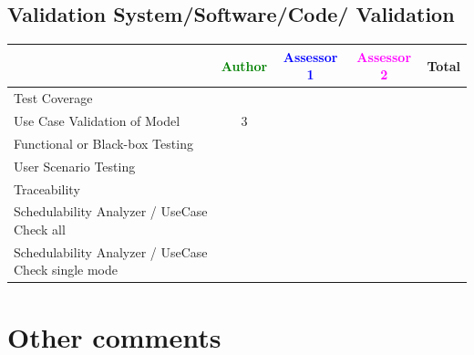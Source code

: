 	
\subsection{Validation System/Software/Code/ Validation	}


\begin{tabular}{|l | c | c | c | c|}
\hline
& \textcolor{green}{Author} & \textcolor{blue}{Assessor 1} & \textcolor{magenta}{Assessor 2} & Total \\
\hline 
Test Coverage & & & &  \\
\hline
Use Case Validation of Model & 3& & &  \\
\hline
Functional or Black-box Testing & & & &  \\
\hline
User Scenario Testing & & & &  \\
\hline
Traceability & & & &  \\
\hline
Schedulability Analyzer / UseCase Check all & & & &  \\
\hline
Schedulability Analyzer / UseCase Check single mode & & & &  \\
\hline

\end{tabular}



\section{Other comments}

